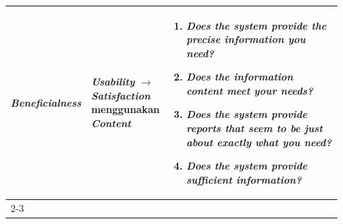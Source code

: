 \begin{longtable}{|p{0.2\linewidth}|p{0.2\linewidth}|p{0.53\linewidth}|}
      \textbf{\textit{Beneficialness}}                            & \textbf{\textit{Usability} $\rightarrow$ \textit{Satisfaction}} menggunakan \textbf{\textit{Content}}                                                   & \begin{enumerate}[before=\vspace{-8pt}, leftmargin=*, nosep, series=SC] \item \textit{Does the system provide the precise information you need?} \item \textit{Does the information content meet your needs?} \item \textit{Does the system provide reports that seem to be just about exactly what you need?} \item \textit{Does the system provide sufficient information?} \end{enumerate}                                                                                                                                                                                                                                                                                                                                                                                                                                                                                                                                                                                                                                                                                                                                                                                                                                                                                                                                                                                                                                \\
      \cline{2-3}


\end{longtable}
